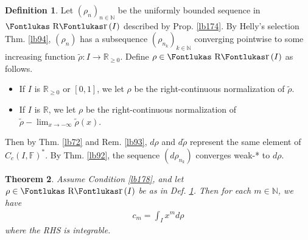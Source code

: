 \documentclass[12pt,b5paper,notitlepage]{article}
\theoremstyle{definition}
\newtheorem{df}{Definition}[subsection]
\theoremstyle{plain}
\newtheorem{thm}[df]{Theorem}
\DeclareMathOperator{\Rr}{\text{\Fontlukas R}\text{\kern -0pt {\Fontlukas\large r}}\,}
\newcommand{\wtd}{\widetilde}
\newcommand{\Nbb}{\mathbb N}
\newcommand{\Rbb}{\mathbb R}
\newcommand{\Fbb}{\mathbb F}
\numberwithin{equation}{section}
\begin{document}
\begin{df}\label{lb175}
Let $(\rho_n)_{n\in\Nbb}$ be the uniformly bounded sequence in $\Rr(I)$ described by Prop. \ref{lb174}. By Helly's selection Thm. \ref{lb94}, $(\rho_n)$ has a subsequence $(\rho_{n_k})_{k\in\Nbb}$ converging pointwise to some increasing function $\wtd\rho:I\rightarrow\Rbb_{\geq0}$. Define $\rho\in\Rr(I)$ as follows.
\begin{itemize}
\item If $I$ is $\Rbb_{\geq0}$ or $[0,1]$, we let $\rho$ be the right-continuous normalization of $\wtd\rho$.
\item If $I$ is $\Rbb$, we let $\rho$ be the right-continuous normalization of $\wtd\rho-\lim_{x\rightarrow-\infty}\wtd\rho(x)$.
\end{itemize}
Then by Thm. \ref{lb72} and Rem. \ref{lb93}, $d\rho$ and $d\wtd\rho$ represent the same element of $C_c(I,\Fbb)^*$. By Thm. \ref{lb92}, the sequence $(d\rho_{n_k})$ converges weak-* to $d\rho$.
\end{df}


\begin{thm}\label{lb177}
Assume Condition \ref{lb178}, and let $\rho\in\Rr(I)$ be as in Def. \ref{lb175}. Then for each $m\in\Nbb$, we have
\begin{align}\label{eq234}
c_m=\int_I x^md\rho
\end{align}
where the RHS is integrable.
\end{thm}
\end{document}
